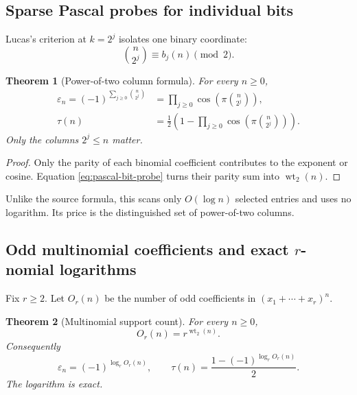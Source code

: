 \documentclass[11pt,oneside]{article}
\numberwithin{equation}{section}
\newtheorem{theorem}{Theorem}[section]
\theoremstyle{definition}
\theoremstyle{remark}
\newcommand{\wt}{\operatorname{wt}_2}
\newcommand{\eps}{\varepsilon}
\begin{document}
\subsection{Sparse Pascal probes for individual bits}

Lucas's criterion at \(k=2^j\) isolates one binary coordinate:
\begin{equation}
  \binom{n}{2^j}\equiv b_j(n)\pmod2.
  \label{eq:pascal-bit-probe}
\end{equation}

\begin{theorem}[Power-of-two column formula]
\label{thm:sparse-pascal-probes}
For every \(n\ge0\),
\begin{align}
  \boxed{
  \eps_n=(-1)^{\sum_{j\ge0}\binom{n}{2^j}}}
  &=\prod_{j\ge0}\cos\!\left(\pi\binom{n}{2^j}\right),
  \label{eq:sparse-pascal-sign}\\
  \tau(n)&=\frac12\left(
      1-\prod_{j\ge0}\cos\!\left(\pi\binom{n}{2^j}\right)
    \right).
  \label{eq:sparse-pascal-bit}
\end{align}
Only the columns \(2^j\le n\) matter.
\end{theorem}

\begin{proof}
Only the parity of each binomial coefficient contributes to the exponent or
cosine.  Equation \eqref{eq:pascal-bit-probe} turns their parity sum into
\(\wt(n)\).
\end{proof}

Unlike the source formula, this scans only \(O(\log n)\) selected entries and
uses no logarithm.  Its price is the distinguished set of power-of-two
columns.

\subsection{Odd multinomial coefficients and exact \texorpdfstring{\(r\)}{r}-nomial logarithms}

Fix \(r\ge2\).  Let \(O_r(n)\) be the number of odd coefficients in
\((x_1+\cdots+x_r)^n\).

\begin{theorem}[Multinomial support count]
\label{thm:multinomial-support}
For every \(n\ge0\),
\begin{equation}
  \boxed{O_r(n)=r^{\wt(n)}.}
  \label{eq:multinomial-support}
\end{equation}
Consequently
\begin{equation}
  \boxed{
  \eps_n=(-1)^{\log_rO_r(n)},
  \qquad
  \tau(n)=\frac{1-(-1)^{\log_rO_r(n)}}2.}
  \label{eq:multinomial-log}
\end{equation}
The logarithm is exact.
\end{theorem}
\end{document}
